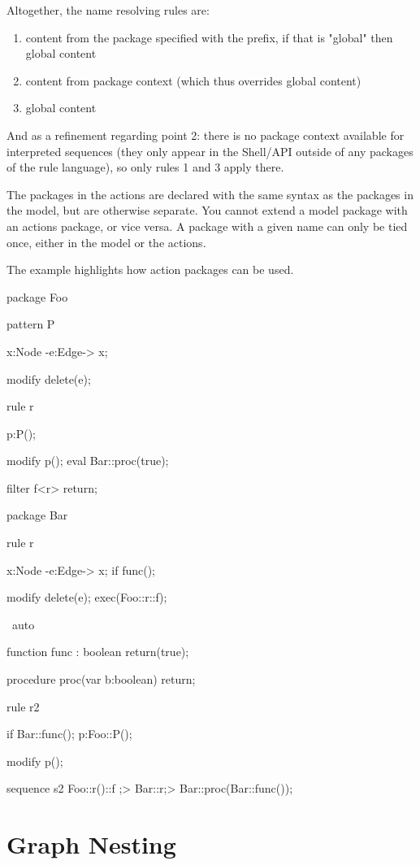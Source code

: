 Altogether, the name resolving rules are:
\begin{enumerate}
	\item content from the package specified with the prefix, if that is "global" then global content
	\item content from package context (which thus overrides global content)
	\item global content 
\end{enumerate}
And as a refinement regarding point 2: there is no package context available for interpreted sequences (they only appear in the Shell/API outside of any packages of the rule language), so only rules 1 and 3 apply there.

The packages in the actions are declared with the same syntax as the packages in the model, but are otherwise separate. 
You cannot extend a model package with an actions package, or vice versa.
A package with a given name can only be tied once, either in the model or the actions.

\begin{example}
The example highlights how action packages can be used.
	\begin{grgen}
package Foo {
	pattern P {
		x:Node -e:Edge-> x;

		modify {
			delete(e);
		}
	}
	
	rule r {
		p:P();

		modify {
			p();
			eval { Bar::proc(true); }
		}
	}
	
	filter f<r> {
		return;
	}
}

package Bar {
	rule r {
		x:Node -e:Edge-> x;
		if{ func(); }

		modify {
			delete(e);
			exec(Foo::r\Foo::f);
		}
	} \ auto
		
	function func : boolean {
		return(true);
	}
	
	procedure proc(var b:boolean) {
		return;
	}	
}

rule r2 {
	if{ Bar::func(); }
	p:Foo::P();
	
	modify {
		p();
	}
}

sequence s2 {
	Foo::r()\Foo::f ;> Bar::r\auto ;> { Bar::proc(Bar::func()); }
}
	\end{grgen}
\end{example}

\section{Graph Nesting}\label{sec:graphnesting}

